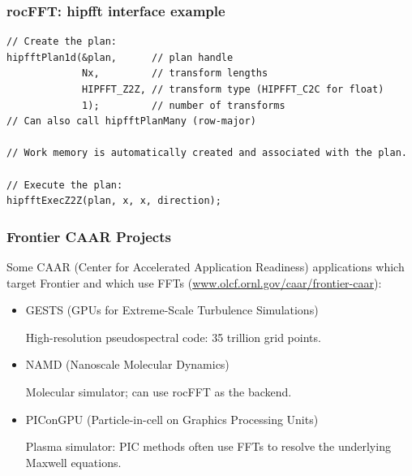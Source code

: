 \documentclass[10pt,aspectratio=169]{beamer}
\begin{document}
\begin{frame}[fragile]
    \frametitle{rocFFT: hipfft interface example}

\begin{lstlisting}
// Create the plan:
hipfftPlan1d(&plan,      // plan handle
             Nx,         // transform lengths
             HIPFFT_Z2Z, // transform type (HIPFFT_C2C for float)
             1);         // number of transforms
// Can also call hipfftPlanMany (row-major)
             
// Work memory is automatically created and associated with the plan.

// Execute the plan:
hipfftExecZ2Z(plan, x, x, direction);
\end{lstlisting}

\end{frame}




  
  

\begin{frame}
  \frametitle{Frontier CAAR Projects}

  Some CAAR (Center for Accelerated Application Readiness) applications which target
  Frontier and which use FFTs (\url{www.olcf.ornl.gov/caar/frontier-caar}):

  \bigskip

  \begin{itemize}
  \item {GESTS (GPUs for Extreme-Scale Turbulence Simulations)}

    High-resolution pseudospectral code: 35 trillion grid points.

    \medskip
    
  \item{NAMD (Nanoscale Molecular Dynamics)}

    Molecular simulator; can use rocFFT as the backend.

        \medskip
  \item{PIConGPU (Particle-in-cell on Graphics Processing Units)}

    Plasma simulator: PIC methods often use FFTs to resolve the underlying Maxwell
    equations.
  \end{itemize}
  
\end{frame}
\end{document}

